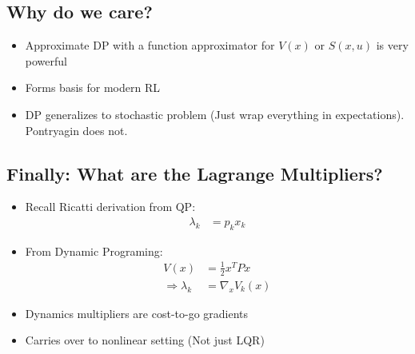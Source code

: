 \documentclass[11pt]{article}
\begin{document}
\subsection{Why do we care?}
\begin{itemize}
    \item Approximate DP with a function approximator for $V(x)$ or $S(x,u)$ is very powerful
    \item Forms basis for modern RL
    \item DP generalizes to stochastic problem (Just wrap everything in expectations). Pontryagin does not.
\end{itemize}

\subsection{Finally: What are the Lagrange Multipliers?}
\begin{itemize}
    \item Recall Ricatti derivation from QP:
    \begin{align*}
        \lambda_k &= p_kx_k
    \end{align*}
    \item From Dynamic Programing:
    \begin{align*}
        V(x) &= \frac{1}{2}x^TPx
        \\
        \Rightarrow \lambda_k &= \nabla_x V_k(x)
    \end{align*}
    \item Dynamics multipliers are cost-to-go gradients
    \item Carries over to nonlinear setting (Not just LQR)
\end{itemize}
\end{document}
